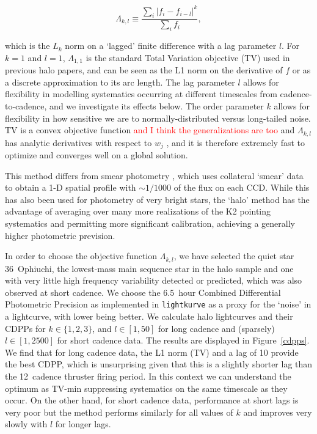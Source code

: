 \documentclass[modern]{aastex62}
\begin{document}
\begin{equation}
    \Lambda_{k,l} \equiv \frac{\sum_i{|f_i - f_{i-l}|^k}}{\sum_i {f_i}},
\end{equation}

\noindent which is the $L_k$ norm on a `lagged' finite difference with a lag parameter $l$. For $k = 1$ and $l = 1$, $\Lambda_{1,1}$ is the standard Total Variation objective (TV) used in previous halo papers, and can be seen as the L1 norm on the derivative of $f$ or as a discrete approximation to its arc length. The lag parameter $l$ allows for flexibility in modelling systematics occurring at different timescales from cadence-to-cadence, and we investigate its effects below. The order parameter $k$ allows for flexibility in how sensitive we are to normally-distributed versus long-tailed noise. TV is a convex objective function \textcolor{red}{and I think the generalizations are too} and $\Lambda_{k,l}$ has analytic derivatives with respect to $w_j$ \citep[calculated with \texttt{autograd}][]{autograd}, and it is therefore extremely fast to optimize and converges well on a global solution.

This method differs from smear photometry \citep{Pope2016}, which uses collateral `smear' data to obtain a 1-D spatial profile with $\sim 1/1000$ of the flux on each CCD. While this has also been used for photometry of very bright stars, the `halo' method has the advantage of averaging over many more realizations of the K2 pointing systematics and permitting more significant calibration, achieving a generally higher photometric prevision.


In order to choose the objective function $\Lambda_{k,l}$, we have selected the quiet star 36~Ophiuchi, the lowest-mass main sequence star in the halo sample and one with very little high frequency variability detected or predicted, which was also observed at short cadence. We choose the 6.5~hour Combined Differential Photometric Precision \citep[CDPP,][]{cdpp} as implemented in \texttt{lightkurve} \citep{lightkurve} as a proxy for the `noise' in a lightcurve, with lower being better. We calculate halo lightcurves and their CDPPs for $k \in \{1,2,3\}$, and $l \in [1,50]$ for long cadence and (sparsely) $l \in [1,2500]$ for short cadence data. The results are displayed in Figure~\ref{cdpps}. We find that for long cadence data, the L1 norm (TV) and a lag of 10 provide the best CDPP, which is unsurprising given that this is a slightly shorter lag than the 12~cadence thruster firing period. In this context we can understand the optimum as TV-min suppressing systematics on the same timescale as they occur. On the other hand, for short cadence data, performance at short lags is very poor but the method performs similarly for all values of $k$ and improves very slowly with $l$ for longer lags. 
\end{document}

